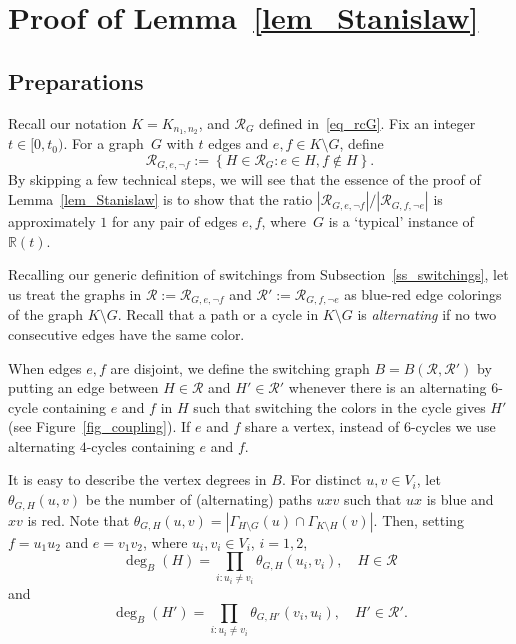 \documentclass[12pt,reqno]{amsart}
\newcommand{\rc}{{\mathcal{R}}}
\newcommand{\R} {\mathbb R}
\newcommand{\Knn} {K_{n_1,n_2}}
\theoremstyle{definition}
\begin{document}
\section{Proof of Lemma~\ref{lem_Stanislaw}}
\label{sec_lemmaproof}

\subsection{Preparations}\label{ss_prep} Recall our notation $K = \Knn$, and $\rc_G$ defined in~\eqref{eq_rcG}. Fix an integer $t \in [0, t_0)$. For a graph~$G$ with $t$ edges and $e, f \in K\setminus G$, define
\begin{equation*}
	\rc_{G,e,\neg f} := \left\{ H \in \rc_G : e \in  H, f \notin H\right\}.
\end{equation*}
By skipping a few technical steps, we will see that the essence of the proof of Lemma~\ref{lem_Stanislaw} is to show that the ratio ${|\rc_{G,e,\neg f}|} / {|\rc_{G,f,\neg e}|}$ is approximately $1$ for any pair of edges $e,f$, where~$G$ is a `typical' instance of $\R(t)$.

Recalling our generic definition of  switchings from Subsection~\ref{ss_switchings}, let us treat the graphs in $\rc := \rc_{G,e,\neg f}$ and $\rc' := \rc_{G,f,\neg e}$ as blue-red edge colorings of the graph $K \setminus G$.
Recall that a path or a cycle in $K \setminus G$ is \emph{alternating} if no two consecutive edges have the same color.

When edges $e,f$ are disjoint, we define the switching graph $B = B(\rc,\rc')$ by putting an edge between $H \in \rc$ and $H' \in \rc'$ whenever there is an alternating $6$-cycle containing $e$ and $f$ in $H$ such that switching the colors in the cycle gives $H'$ (see Figure~\ref{fig_coupling}). If $e$ and $f$ share a vertex, instead of $6$-cycles we use alternating $4$-cycles containing $e$ and $f$.

It is easy to describe the vertex degrees in $B$.
For distinct $u,v\in V_i$, let $\theta_{G,H}(u,v)$ be the number of (alternating) paths $uxv$ such that $ux$ is blue and $xv$ is red.
Note that $\theta_{G,H}(u,v) = |\Gamma_{H\setminus G}(u)\cap\Gamma_{K\setminus H}(v)|$.
 Then, setting  $f = u_1u_2$ and $e = v_1v_2$, where $u_i,v_i\in V_i$, $i = 1,2$,
\begin{equation}
  \label{eq_deg_forw}
	\deg_B(H) = \prod_{i: u_i \neq v_i}\theta_{G,H}(u_i,v_i), \quad H \in \rc
\end{equation}
and
\begin{equation}
  \label{eq_deg_back}
	\deg_B(H') = \prod_{i: u_i \neq v_i}\theta_{G,H'}(v_i,u_i), \quad H' \in \rc'.
\end{equation}
\end{document}
